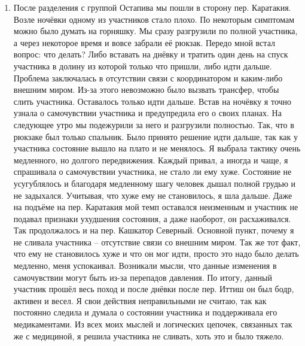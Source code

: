 \begin{enumerate}
		 же была явная ошибка с точки зрения руковода после МН5. Как руководитель, я хотела, чтобы каждый участник моей группы был осведомлён о том куда идём, сколько и каким именно образом. Поэтому каждый вечер и практически на каждом важном привале я старалась обозначить куда идём. Только в этот раз я и штурман проворонили наличие подъёма на нашем пути, из-за чего группа расклеилась. И здесь был поздний выход, опять же связанный с ожиданием группы Алексея. Так же накануне этого дня нам пришло сообщение от нашего координатора, что ожидается сильный ливень. Взвесив всё это: то, что мы уже уже должны соединиться с группой Остапива, то, что будет дождь и то, что после Кашкатора Северного и Ашутора Западного нужно больше отдыха, я решила отодвинуть подъём на чуть более поздний час. В данный день была ошибка со стороны руководителя. Я не сказала группе про весьма серьёзный набор высоты, из-за чего мною были недовольны. 
		\item После разделения с группой Остапива мы пошли в сторону пер. Каратакия. Возле ночёвки одному из участников стало плохо. По некоторым симптомам можно было думать на горняшку. Мы сразу разгрузили по полной участника, а через некоторое время и вовсе забрали её рюкзак. Передо мной встал вопрос: что делать? Либо вставать на днёвку и тратить один день на спуск участника в долину из которой только что пришли, либо идти дальше. Проблема заключалась в отсутствии связи с координатором и каким-либо внешним миром. Из-за этого невозможно было вызвать трансфер, чтобы слить участника. Оставалось только идти дальше. Встав на ночёвку я точно узнала о самочувствии участника и предупредила его о своих планах. На следующее утро мы подежурили за него и разгрузили полностью. Так, что в рюкзаке был только спальник. Было принято решение идти дальше, так как у участника состояние вышло на плато и не менялось. Я выбрала тактику очень медленного, но долгого передвижения. Каждый привал, а иногда и чаще, я спрашивала о самочувствии участника, не стало ли ему хуже. Состояние не усугублялось и благодаря медленному шагу человек дышал полной грудью и не задыхался. Учитывая, что хуже ему не становилось, я шла дальше. Даже на подъёме на пер. Каратакия мой темп оставался неизменным и участник не подавал признаки ухудшения состояния, а даже наоборот, он расхаживался. Так продолжалось и на пер. Кашкатор Северный. Основной пункт, почему я не сливала участника – отсутствие связи со внешним миром. Так же тот факт, что ему не становилось хуже и что он мог идти, просто это надо было делать медленно, меня успокаивал. Возникали мысли, что данные изменения в самочувствии могут быть из-за перепадов давления. По итогу, данный участник прошёл весь поход и после днёвки после пер. Иттиш он был бодр, активен и весел. Я свои действия неправильными не считаю, так как постоянно следила и думала о состоянии участника и поддерживала его медикаментами. Из всех моих мыслей и логических цепочек, связанных так же с медициной, я решила участника не сливать, хоть это и было тяжело. 

\end{enumerate}
